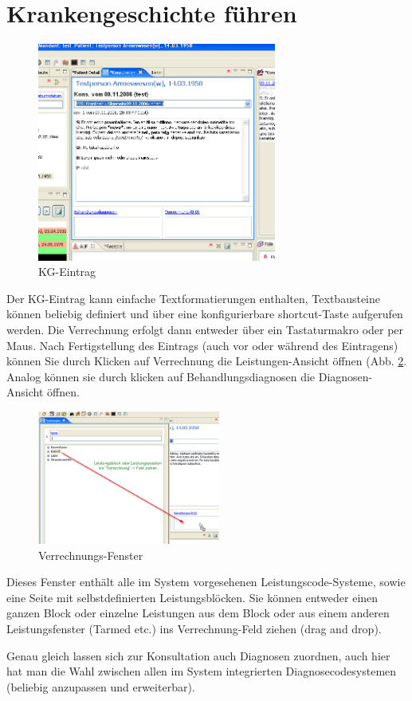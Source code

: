 \section{Krankengeschichte führen}
\begin{figure}
    \begin{center}
	   \includegraphics[width=0.7\textwidth]{images/einf6}
    	\caption{KG-Eintrag}
	   \label{fig:KG}
    \end{center}
\end{figure}
Der KG-Eintrag kann einfache Textformatierungen enthalten, Textbausteine können
beliebig definiert und über eine konfigurierbare shortcut-Taste aufgerufen werden. Die Verrechnung erfolgt dann entweder über ein Tastaturmakro oder per Maus.
Nach Fertigstellung des Eintrags (auch vor oder während des Eintragens) können
Sie durch Klicken auf \glqq Verrechnung\grqq{} die Leistungen-Ansicht öffnen
(Abb. \ref{fig:Verrechnung}. Analog können sie durch klicken auf
\glqq Behandlungsdiagnosen\grqq{} die Diagnosen-Ansicht öffnen.

\begin{figure}[ht]
	\includegraphics[width=6cm]{images/einf7}
	\caption{Verrechnungs-Fenster}
	\label{fig:Verrechnung}
\end{figure}
Dieses Fenster enthält alle im System vorgesehenen Leistungscode-Systeme, sowie eine Seite mit selbstdefinierten Leistungsblöcken.
Sie können entweder einen ganzen Block oder einzelne Leistungen aus dem Block oder aus einem anderen Leistungsfenster (Tarmed etc.) ins \glqq Verrechnung\grqq{}-Feld ziehen (drag and drop).

Genau gleich lassen sich zur Konsultation auch Diagnosen zuordnen, auch hier hat man die Wahl zwischen allen im System integrierten Diagnosecodesystemen (beliebig anzupassen und erweiterbar).

\clearpage
